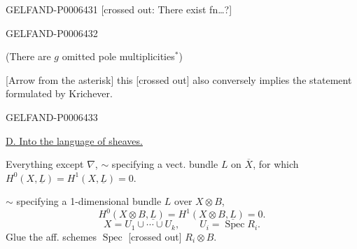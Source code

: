 \begin{GelfandAdjacentEvidence}{GELFAND-P000643}{1}
[crossed out: There exist fn…?]
\end{GelfandAdjacentEvidence}
\begin{GelfandAdjacentEvidence}{GELFAND-P000643}{2}

(There are \(g\) omitted pole multiplicities\({}^*\))

[Arrow from the asterisk] this [crossed out] also conversely implies the statement formulated by Krichever.
\end{GelfandAdjacentEvidence}
\begin{GelfandAdjacentEvidence}{GELFAND-P000643}{3}


\underline{D. Into the language of sheaves.}

Everything except \(\nabla\), \(\sim\) specifying a vect. bundle \(L\) on \(\overline X\),
for which \(H^0(X,\underline L)=H^1(X,\underline L)=0\).

\(\sim\) specifying a 1-dimensional bundle \(L\) over \(X\otimes B\),
\[
H^0(X\otimes B,\underline L)=H^1(X\otimes B,\underline L)=0.
\]
\[
X=U_1\cup\cdots\cup U_k,\qquad U_i=\operatorname{Spec}R_i.
\]
Glue the aff. schemes \(\operatorname{Spec}\) [crossed out] \(R_i\otimes B\).
\end{GelfandAdjacentEvidence}
